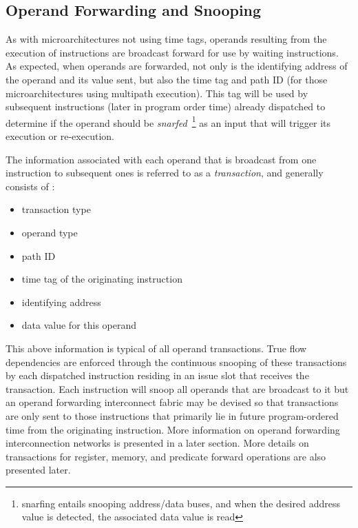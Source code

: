 \documentclass{book}
\begin{document}
\subsection{Operand Forwarding and Snooping}
%
As with microarchitectures not using time tags,
operands resulting from the execution of instructions
are broadcast forward for use by waiting instructions.
As expected, when operands are forwarded, not only is the 
identifying address of the operand
and its value sent, but also the time tag and path ID 
(for those microarchitectures using multipath execution).
This tag will be used by subsequent 
instructions 
(later in program order time)
already dispatched
to determine if
the operand should be {\em snarfed}~\footnote{snarfing entails snooping
address/data buses, and when the desired address value is detected, 
the associated data value is read} 
as an input that will trigger
its execution or re-execution.

The information associated with each operand that is
broadcast from one instruction to subsequent ones
is referred
to as a {\em transaction}, and generally consists of :
%
\begin{itemize}
\vspace{-0.10in}
\item{transaction type}
\vspace{-0.10in}
\item{operand type}
\vspace{-0.10in}
\item{path ID}
\vspace{-0.10in}
\item{time tag of the originating instruction}
\vspace{-0.10in}
\item{identifying address}
\vspace{-0.10in}
\item{data value for this operand}
\vspace{-0.10in}
\end{itemize}   
%
This above information is typical of all operand transactions.
True flow dependencies are enforced through the continuous snooping of
these transactions by each dispatched instruction residing in an issue
slot that receives the transaction.
Each instruction
will snoop all operands that are broadcast to it but
an operand forwarding interconnect fabric may be devised so that
transactions are only sent to those instructions that primarily
lie in future program-ordered time from the originating instruction.  
More information on operand forwarding interconnection networks
is presented in a later section.
More details on transactions for register, memory, and
predicate forward operations are also presented later.
\end{document}
